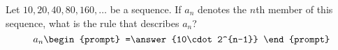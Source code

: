 \documentclass{ximera}
\author{Gregory Hartman \and Matthew Carr}
\begin{document}
\begin{exercise}



Let  $10, 20, 40, 80, 160, \ldots$ be a sequence. If $a_n$ denotes the $n$th member of this sequence, what is the rule that describes $a_n$?
\[
a_n
\begin{prompt}
=\answer{10\cdot 2^{n-1}}
\end{prompt}
\]

\end{exercise}
\end{document}
